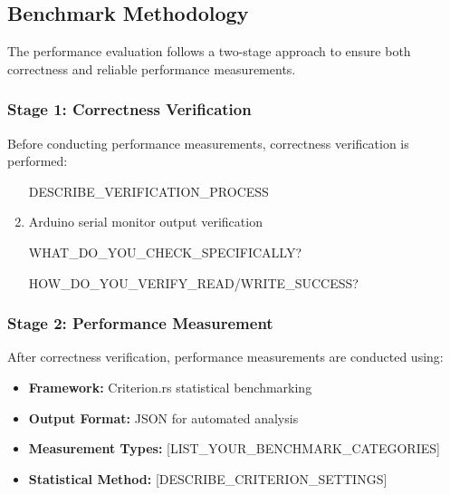
\subsection{Benchmark Methodology}
\label{subsec:benchmark-methodology}

The performance evaluation follows a two-stage approach to ensure both correctness and reliable performance measurements.

\subsubsection{Stage 1: Correctness Verification}

Before conducting performance measurements, correctness verification is performed:
\begin{enumerate}
    \item [DESCRIBE\_VERIFICATION\_PROCESS]
    \item Arduino serial monitor output verification
    \item [WHAT\_DO\_YOU\_CHECK\_SPECIFICALLY?]
    \item [HOW\_DO\_YOU\_VERIFY\_READ/WRITE\_SUCCESS?]
\end{enumerate}


\subsubsection{Stage 2: Performance Measurement}

After correctness verification, performance measurements are conducted using:
\begin{itemize}
    \item \textbf{Framework:} Criterion.rs statistical benchmarking
    \item \textbf{Output Format:} JSON for automated analysis
    \item \textbf{Measurement Types:} [LIST\_YOUR\_BENCHMARK\_CATEGORIES]
    \item \textbf{Statistical Method:} [DESCRIBE\_CRITERION\_SETTINGS]
\end{itemize}

